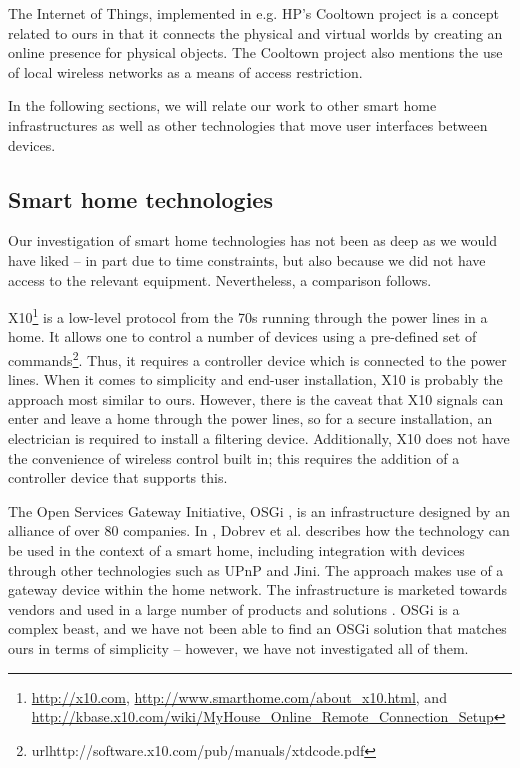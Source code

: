 \documentclass{ubicomp2012}
\begin{document}
The Internet of Things, implemented in e.g. HP's Cooltown project \cite{cooltown} is a concept related to ours in that it connects the physical and virtual worlds by creating an online presence for physical objects. The Cooltown project also mentions the use of local wireless networks as a means of access restriction.

In the following sections, we will relate our work to other smart home infrastructures as well as other technologies that move user interfaces between devices.

\subsection{Smart home technologies}
Our investigation of smart home technologies has not been as deep as we would have liked -- in part due to time constraints, but also because we did not have access to the relevant equipment. Nevertheless, a comparison follows.

X10\footnote{\url{http://x10.com}, \url{http://www.smarthome.com/about_x10.html}, and \url{http://kbase.x10.com/wiki/MyHouse_Online_Remote_Connection_Setup}} is a low-level protocol from the 70s running through the power lines in a home. It allows one to control a number of devices using a pre-defined set of commands\footnote{url{http://software.x10.com/pub/manuals/xtdcode.pdf}}. Thus, it requires a controller device which is connected to the power lines. When it comes to simplicity and end-user installation, X10 is probably the approach most similar to ours. However, there is the caveat that X10 signals can enter and leave a home through the power lines, so for a secure installation, an electrician is required to install a filtering device. Additionally, X10 does not have the convenience of wireless control built in; this requires the addition of a controller device that supports this.

The Open Services Gateway Initiative, OSGi \cite{osgiIntroduction}, is an infrastructure designed by an alliance of over 80 companies. In \cite{osgiDiscovery}, Dobrev et al. describes how the technology can be used in the context of a smart home, including integration with devices through other technologies such as UPnP and Jini. The approach makes use of a gateway device within the home network. The infrastructure is marketed towards vendors and used in a large number of products and solutions \cite{osgiMarkets}. OSGi is a complex beast, and we have not been able to find an OSGi solution that matches ours in terms of simplicity -- however, we have not investigated all of them.
\end{document}
